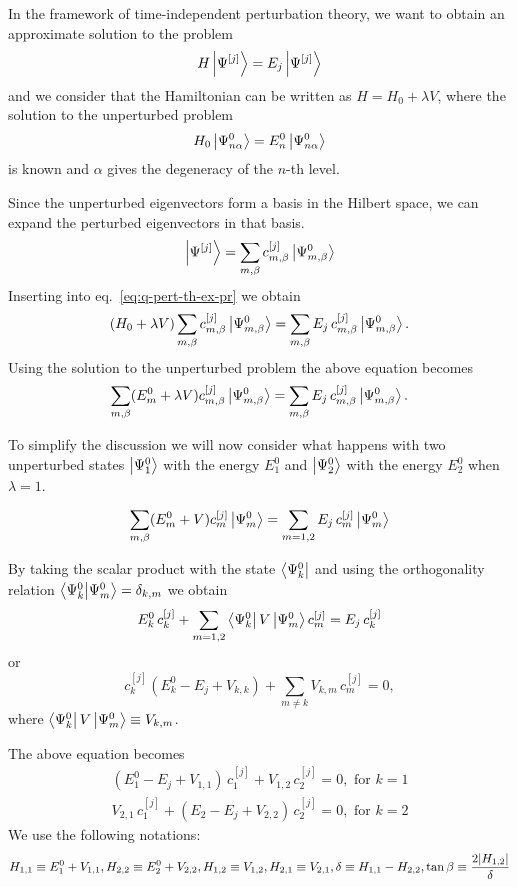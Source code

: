 \documentclass[../thesis.tex]{subfiles}
\theoremstyle{definition}
\begin{document}
In the framework of time-independent perturbation theory, we want to obtain
an approximate solution to the problem
\begin{equation}
  H \ket{\Psi^{[j]}} = E_j \ket{\Psi^{[j]}}
\label{eq:q-pert-th-ex-pr}
\end{equation}
and we consider that the Hamiltonian can be written as \(H = H_0 + \lambda V\),
where the solution to the unperturbed problem
\[
  H_0 \ket{\Psi^0_{n\alpha}} = E_n^0 \ket{\Psi^0_{n\alpha}}
\]
is known and \( \alpha \) gives the degeneracy of the \(n\)-th level.

Since the unperturbed eigenvectors form a basis in the Hilbert space, we can
expand the perturbed eigenvectors in that basis.
\[
  \ket{\Psi^{[j]}} = \sum_{m,\beta} c_{m,\beta}^{[j]} \ket{\Psi_{m,\beta}^0}
\]
Inserting into eq.~\eqref{eq:q-pert-th-ex-pr} we obtain
\[
  (H_0 + \lambda V) \sum_{m,\beta} c_{m,\beta}^{[j]} \ket{\Psi_{m,\beta}^0}
  = \sum_{m,\beta} E_j\, c_{m,\beta}^{[j]} \ket{\Psi_{m,\beta}^0}.
\]
Using the solution to the unperturbed problem the above equation becomes
\[
\sum_{m,\beta} (E_m^0 + \lambda V)  c_{m,\beta}^{[j]} \ket{\Psi_{m,\beta}^0}
= \sum_{m,\beta} E_j\, c_{m,\beta}^{[j]} \ket{\Psi_{m,\beta}^0}.
\]

To simplify the discussion we will now consider what happens with two unperturbed
states \(\ket{\Psi_1^0}\) with the energy \(E_1^0\) and \(\ket{\Psi_2^0}\) with
the energy \(E_2^0\) when \(\lambda=1\).

\[
\sum_{m,\beta} (E_m^0 + V)  c_{m}^{[j]} \ket{\Psi_{m}^0}
= \sum_{m=1,2} E_j\, c_{m}^{[j]} \ket{\Psi_{m}^0}
\]

By taking the scalar product with the state \(\bra{\Psi_{k}^0}\) and using the
orthogonality relation
\(\braket{\Psi_{k}^0}{\Psi_{m}^0} = \delta_{k,m}\)
we obtain
\[
E_k^0\, c_{k}^{[j]} + \sum_{m=1,2} \bra{\Psi_{k}^0} V \ket{\Psi_{m}^0} c_{m}^{[j]}
= E_j\, c_{k}^{[j]}
\]
or
\[
  c_{k}^{[j]} \left( E_k^0 - E_j + V_{k,k} \right) + \sum_{m \neq k} V_{k,m}\, c_{m}^{[j]} = 0,
\]
where \(\bra{\Psi_{k}^0} V \ket{\Psi_{m}^0} \equiv V_{k,m}\).

The above equation becomes
\begin{align*}
  (E_1^0 - E_j + V_{1,1})\, c_1^{[j]} + V_{1,2}\, c_2^{[j]} = 0, \text{ for } k=1 \\
  V_{2,1}\, c_1^{[j]} + (E_2 - E_j + V_{2,2})\, c_2^{[j]} = 0, \text{ for } k=2
\end{align*}
We use the following notations:
\[
  H_{1,1} \equiv E_1^0 + V_{1,1}, H_{2,2} \equiv E_2^0 + V_{2,2}, H_{1,2} \equiv V_{1,2},
  H_{2,1} \equiv V_{2,1}, \delta \equiv H_{1,1} - H_{2,2}, \tan{\beta} \equiv \frac{2\abs{H_{1,2}}}{\delta}
\]
\end{document}
